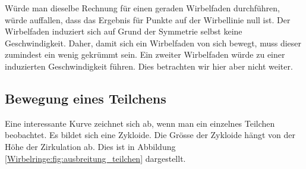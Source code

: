 Würde man dieselbe Rechnung für einen geraden Wirbelfaden durchführen, würde auffallen, dass das Ergebnis für Punkte auf der Wirbellinie null ist.
Der Wirbelfaden induziert sich auf Grund der Symmetrie selbst keine Geschwindigkeit.
Daher, damit sich ein Wirbelfaden von sich bewegt, muss dieser zumindest ein wenig gekrümmt sein.
Ein zweiter Wirbelfaden würde zu einer induzierten Geschwindigkeit führen. 
Dies betrachten wir hier aber nicht weiter. 

\subsection{Bewegung eines Teilchens}



Eine interessante Kurve zeichnet sich ab, wenn man ein einzelnes Teilchen beobachtet.
Es bildet sich eine Zykloide.
Die Grösse der Zykloide hängt von der Höhe der Zirkulation ab.
Dies ist in Abbildung \ref{Wirbelringe:fig:ausbreitung_teilchen} dargestellt.
